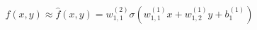 \documentclass[preview]{standalone}
\begin{document}
\begin{align*}
f(x,y) \approx \hat{f}(x,y) =  w_{1,1}^{(2)} \sigma(w_{1,1}^{(1)}x + w_{1,2}^{(1)}y +b_1^{(1)})
\end{align*}
\end{document}
